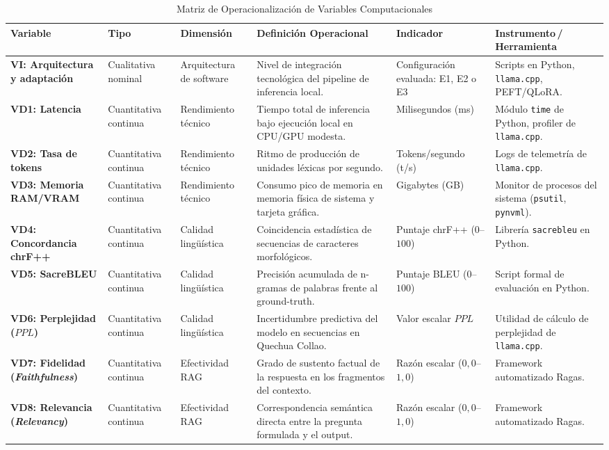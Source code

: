 \documentclass[12pt]{article}
\begin{document}
\begin{table}[H]
\centering
\caption{Matriz de Operacionalización de Variables Computacionales}
\label{tab:operacionalizacion}
\tiny
\begin{tabularx}{\textwidth}{@{}p{2.4cm}p{1.7cm}p{1.9cm}p{2.5cm}p{1.8cm}p{2.1cm}@{}}
\toprule
\textbf{Variable} & \textbf{Tipo} & \textbf{Dimensión} & \textbf{Definición Operacional} & \textbf{Indicador} & \textbf{Instrumento\,/\,Herramienta} \\
\midrule
\textbf{VI: Arquitectura y adaptación} & Cualitativa nominal & Arquitectura de software & Nivel de integración tecnológica del pipeline de inferencia local. & Configuración evaluada: E1, E2 o E3 & Scripts en Python, \texttt{llama.cpp}, PEFT/QLoRA. \\
\midrule
\textbf{VD1: Latencia} & Cuantitativa continua & Rendimiento técnico & Tiempo total de inferencia bajo ejecución local en CPU/GPU modesta. & Milisegundos (ms) & Módulo \texttt{time} de Python, profiler de \texttt{llama.cpp}. \\
\midrule
\textbf{VD2: Tasa de tokens} & Cuantitativa continua & Rendimiento técnico & Ritmo de producción de unidades léxicas por segundo. & Tokens/segundo (t/s) & Logs de telemetría de \texttt{llama.cpp}. \\
\midrule
\textbf{VD3: Memoria RAM/VRAM} & Cuantitativa continua & Rendimiento técnico & Consumo pico de memoria en memoria física de sistema y tarjeta gráfica. & Gigabytes (GB) & Monitor de procesos del sistema (\texttt{psutil}, \texttt{pynvml}). \\
\midrule
\textbf{VD4: Concordancia chrF++} & Cuantitativa continua & Calidad lingüística & Coincidencia estadística de secuencias de caracteres morfológicos. & Puntaje chrF++ ($0$--$100$) & Librería \texttt{sacrebleu} en Python. \\
\midrule
\textbf{VD5: SacreBLEU} & Cuantitativa continua & Calidad lingüística & Precisión acumulada de n-gramas de palabras frente al ground-truth. & Puntaje BLEU ($0$--$100$) & Script formal de evaluación en Python. \\
\midrule
\textbf{VD6: Perplejidad ($PPL$)} & Cuantitativa continua & Calidad lingüística & Incertidumbre predictiva del modelo en secuencias en Quechua Collao. & Valor escalar $PPL$ & Utilidad de cálculo de perplejidad de \texttt{llama.cpp}. \\
\midrule
\textbf{VD7: Fidelidad (\textit{Faithfulness})} & Cuantitativa continua & Efectividad RAG & Grado de sustento factual de la respuesta en los fragmentos del contexto. & Razón escalar ($0,0$--$1,0$) & Framework automatizado Ragas. \\
\midrule
\textbf{VD8: Relevancia (\textit{Relevancy})} & Cuantitativa continua & Efectividad RAG & Correspondencia semántica directa entre la pregunta formulada y el output. & Razón escalar ($0,0$--$1,0$) & Framework automatizado Ragas. \\
\bottomrule
\end{tabularx}
\end{table}
\end{document}
